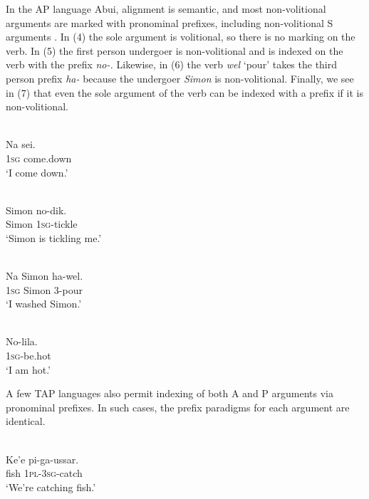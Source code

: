 In the AP language Abui, alignment is semantic, and most non-volitional arguments are marked with pronominal prefixes, including non-volitional S arguments \citep[chapter 10]{FeddenEtAl2013}. In (4) the sole argument is volitional, so there is no marking on the verb. In (5) the first person undergoer is non-volitional and is indexed on the verb with the prefix \textit{no-.} Likewise, in (6) the verb \textit{wel }`pour' takes the third person prefix \textit{ha-} because the undergoer \textit{Simon} is non-volitional. Finally, we see in (7) that even the sole argument of the verb can be indexed with a prefix if it is non-volitional.

\ea%
 \\
\gll  Na sei. \\
  \textsc{1sg} come.down \\
\glt `I come down.'
\z





\ea%
 \\
\gll  Simon no-dik. \\
  Simon \textsc{1sg}-tickle  \\
\glt `Simon is tickling me.'
\z





\ea%
 \\
\gll  Na Simon ha-wel. \\
  \textsc{1sg} Simon 3-pour  \\
\glt `I washed Simon.'
\z





\ea%
 \\
\gll  No-lila. \\
  \textsc{1sg}-be.hot  \\
\glt `I am hot.'
\z





A few TAP languages also permit indexing of both A and P arguments via pronominal prefixes. In such cases, the prefix paradigms for each argument are identical.

\ea%
 \\
\gll  Ke'e pi-ga-ussar. \\
   fish \textsc{1pl-3sg}-catch \\
\glt `We're catching fish.'
\z





